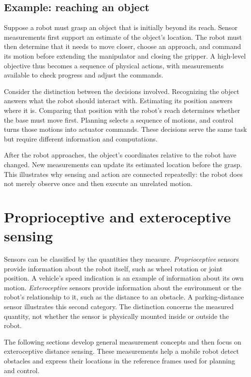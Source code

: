 \subsection{Example: reaching an object}
Suppose a robot must grasp an object that is initially beyond its reach.
Sensor measurements first support an estimate of the object's location.
The robot must then determine that it needs to move closer, choose an approach,
and command its motion before extending the manipulator and closing the gripper.
A high-level objective thus becomes a sequence of physical actions, with
measurements available to check progress and adjust the commands.

Consider the distinction between the decisions involved. Recognizing the
object answers what the robot should interact with. Estimating its position
answers where it is. Comparing that position with the robot's reach determines
whether the base must move first. Planning selects a sequence of motions,
and control turns those motions into actuator commands. These decisions
serve the same task but require different information and computations.

After the robot approaches, the object's coordinates relative to the robot
have changed. New measurements can update its estimated location before the
grasp. This illustrates why sensing and action are connected repeatedly:
the robot does not merely observe once and then execute an unrelated motion.

\section{Proprioceptive and exteroceptive sensing}
Sensors can be classified by the quantities they measure.
\emph{Proprioceptive} sensors provide information about the robot itself,
such as wheel rotation or joint position. A vehicle's speed indication is
an example of information about its own motion. \emph{Exteroceptive} sensors
provide information about the environment or the robot's relationship to it,
such as the distance to an obstacle. A parking-distance sensor illustrates
this second category. The distinction concerns the measured quantity, not
whether the sensor is physically mounted inside or outside the robot.

The following sections develop general measurement concepts and then focus
on exteroceptive distance sensing. These measurements help a mobile robot
detect obstacles and express their locations in the reference frames used
for planning and control.

